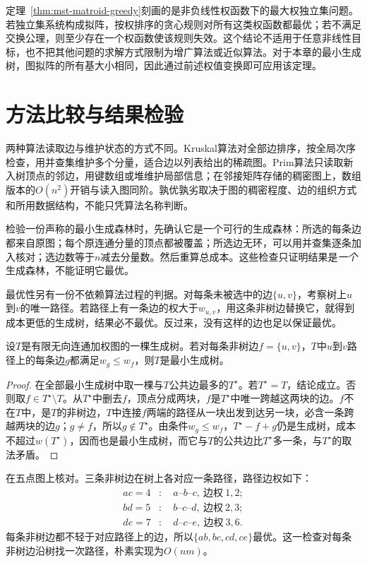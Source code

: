 定理~\ref{thm:mst-matroid-greedy}刻画的是非负线性权函数下的最大权独立集问题。若独立集系统构成拟阵，按权排序的贪心规则对所有这类权函数都最优；若不满足交换公理，则至少存在一个权函数使该规则失效。这个结论不适用于任意非线性目标，也不把其他问题的求解方式限制为增广算法或近似算法。对于本章的最小生成树，图拟阵的所有基大小相同，因此通过前述权值变换即可应用该定理。

\section{方法比较与结果检验}
\label{sec:graph-opt-mst-comparison}

两种算法读取边与维护状态的方式不同。Kruskal算法对全部边排序，按全局次序检查，用并查集维护多个分量，适合边以列表给出的稀疏图。Prim算法只读取新入树顶点的邻边，用键数组或堆维护局部信息；在邻接矩阵存储的稠密图上，数组版本的$O(n^2)$开销与读入图同阶。孰优孰劣取决于图的稠密程度、边的组织方式和所用数据结构，不能只凭算法名称判断。

检验一份声称的最小生成森林时，先确认它是一个可行的生成森林：所选的每条边都来自原图；每个原连通分量的顶点都被覆盖；所选边无环，可以用并查集逐条加入核对；选边数等于$n$减去分量数。然后重算总成本。这些检查只证明结果是\emph{一个}生成森林，不能证明它最优。

最优性另有一份不依赖算法过程的判据。对每条未被选中的边$\{u,v\}$，考察树上$u$到$v$的唯一路径。若路径上有一条边的权大于$w_{u,v}$，用这条非树边替换它，就得到成本更低的生成树，结果必不最优。反过来，没有这样的边也足以保证最优。

\begin{theorem}[非树边条件]
\label{thm:graph-opt-mst-cycle-certificate}
设$T$是有限无向连通加权图的一棵生成树。若对每条非树边$f=\{u,v\}$，$T$中$u$到$v$路径上的每条边$g$都满足$w_g\leq w_f$，则$T$是最小生成树。
\end{theorem}

\begin{proof}
在全部最小生成树中取一棵与$T$公共边最多的$T^\star$。若$T^\star=T$，结论成立。否则取$f\in T^\star\setminus T$。从$T^\star$中删去$f$，顶点分成两块，$f$是$T^\star$中唯一跨越这两块的边。$f$不在$T$中，是$T$的非树边，$T$中连接$f$两端的路径从一块出发到达另一块，必含一条跨越两块的边$g$；$g\neq f$，所以$g\notin T^\star$。由条件$w_g\leq w_f$，$T^\star-f+g$仍是生成树，成本不超过$w(T^\star)$，因而也是最小生成树，而它与$T$的公共边比$T^\star$多一条，与$T^\star$的取法矛盾。
\end{proof}

在五点图上核对。三条非树边在树上各对应一条路径，路径边权如下：
\[
  \begin{aligned}
    ac=4&:\quad a\text{--}b\text{--}c,\ \text{边权}\ 1,2;\\
    bd=5&:\quad b\text{--}c\text{--}d,\ \text{边权}\ 2,3;\\
    de=7&:\quad d\text{--}c\text{--}e,\ \text{边权}\ 3,6.
  \end{aligned}
\]
每条非树边都不轻于对应路径上的边，所以$\{ab,bc,cd,ce\}$最优。这一检查对每条非树边沿树找一次路径，朴素实现为$O(nm)$。

